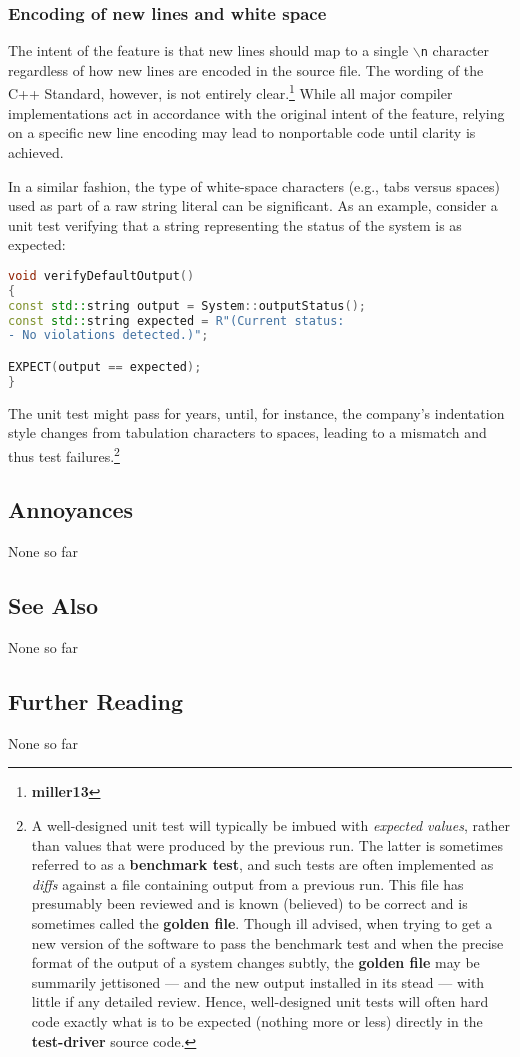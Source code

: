 \subsubsection[Encoding of new lines and white space]{Encoding of new lines and white space}\label{encoding-of-newlines-and-whitespace}

The intent of the feature is that new lines should map to a single
\texttt{$\backslash$n} character regardless of how new lines are encoded
in the source file. The wording of the C++ Standard, however, is not
entirely clear.\footnote{\textbf{miller13}} While all major compiler
implementations act in accordance with the original intent of the
feature, relying on a specific new line encoding may lead to nonportable
code until clarity is achieved.

In a similar fashion, the type of white-space characters (e.g., tabs
versus spaces) used as part of a raw string literal can be significant.
As an example, consider a unit test verifying that a string representing
the status of the system is as expected:

\begin{lstlisting}[language=C++]
void verifyDefaultOutput()
{
const std::string output = System::outputStatus();
const std::string expected = R"(Current status:
- No violations detected.)";

EXPECT(output == expected);
}
\end{lstlisting}

\noindent The unit test might pass for years, until, for instance, the
company's indentation style changes from tabulation characters to
spaces, leading to a mismatch and thus test failures.{\cprotect\footnote{A
well-designed unit test will typically be imbued with \emph{expected
values}, rather than values that were produced by the previous run.
The latter is sometimes referred to as a \textbf{benchmark test}, and such tests are often implemented as \emph{diffs} against
a file containing output from a previous run. This file has
presumably been reviewed and is known (believed) to be correct and is sometimes called the \textbf{golden file}. Though ill advised, when trying to get a new version of the software to pass the benchmark test and when the precise format of the output of a system
changes subtly, the \textbf{golden file} may be summarily jettisoned --- and the new
output installed in its stead --- with little if any detailed review.
Hence, well-designed unit tests will often hard code exactly what is
to be expected (nothing more or less) directly in the
\textbf{test-driver} source code.}}

\subsection[Annoyances]{Annoyances}\label{annoyances}

None so far

\subsection[See Also]{See Also}\label{see-also}

None so far

\subsection[Further Reading]{Further Reading}\label{further-reading}

None so far


